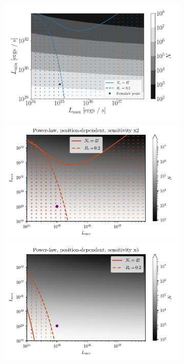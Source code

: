 \documentclass{C://Aliases//Dropbox-MIT//Latex_Templates//personal}
\begin{document}
\begin{figure}
    \centering
    \begin{subfigure}[t]{.45\textwidth}
        \centering
        \includegraphics[width=.99\linewidth]{figs/power-law/power-law-pos-x1.png}
        \includegraphics[width=.99\linewidth]{figs/power-law/power-law-pos-x2.png}
        \includegraphics[width=.99\linewidth]{figs/power-law/power-law-pos-x5.png}

\end{subfigure}
\end{figure}
\end{document}
